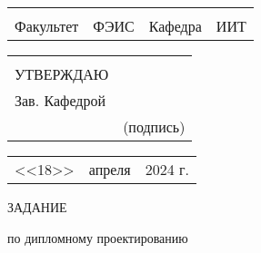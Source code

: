 \documentclass[12pt, А4, twoside]{article} %
\begin{document}
\begin{FlushLeft} %
\fontsize{12}{15} %

    \begin{tabular}{p{1.8cm} p{6.2cm} p{2.0cm} p{6.0cm}} 
        & & & %
        \\ %
        \textsf{Факультет} & 
        \centering \textsf{ФЭИС} \vspace{1pt} \hline &
        \textsf{Кафедра} &
        \centering \textsf{ИИТ} \vspace{1pt} \hline 
    \end{tabular} 

    \begin{tabular}{p{2.5cm} p{5.5cm}} 
        & \\ 
        \textsf{УТВЕРЖДАЮ} & \\
        \textsf{Зав. Кафедрой} & \vspace{1pt} \hline \\ 
        \hspace{2.8cm} &  \centering \textsf{(подпись)} 
    \end{tabular} 

    \begin{tabular}{p{1.0cm} p{5.0cm} p{2.0cm}} 
        \textsf{<<18>>} & 
        \centering \textsf{апреля} \vspace{1pt} \hline &
        \textsf{2024 г.} \\
    \end{tabular}

\end{FlushLeft} %

\begin{Center} 
    \fontsize{24}{30} \textsf{ЗАДАНИЕ}
    \par 
    \fontsize{14}{17.5} \textrm{по дипломному проектированию}
\end{Center}  
\end{document}

